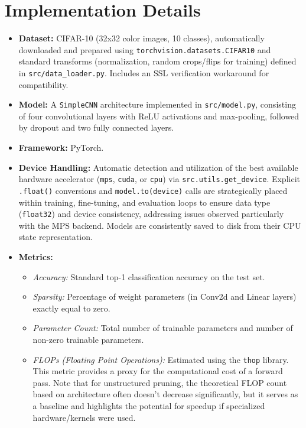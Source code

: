 \documentclass[conference]{IEEEtran} %
\begin{document}
\section{Implementation Details}
\begin{itemize}
    \item \textbf{Dataset:} CIFAR-10 (32x32 color images, 10 classes), automatically downloaded and prepared using \texttt{torchvision.datasets.CIFAR10} and standard transforms (normalization, random crops/flips for training) defined in \texttt{src/data\_loader.py}. Includes an SSL verification workaround for compatibility.
    \item \textbf{Model:} A \texttt{SimpleCNN} architecture implemented in \texttt{src/model.py}, consisting of four convolutional layers with ReLU activations and max-pooling, followed by dropout and two fully connected layers.
    \item \textbf{Framework:} PyTorch.
    \item \textbf{Device Handling:} Automatic detection and utilization of the best available hardware accelerator (\texttt{mps}, \texttt{cuda}, or \texttt{cpu}) via \texttt{src.utils.get\_device}. Explicit \texttt{.float()} conversions and \texttt{model.to(device)} calls are strategically placed within training, fine-tuning, and evaluation loops to ensure data type (\texttt{float32}) and device consistency, addressing issues observed particularly with the MPS backend. Models are consistently saved to disk from their CPU state representation.
    \item \textbf{Metrics:}
        \begin{itemize}
            \item \textit{Accuracy:} Standard top-1 classification accuracy on the test set.
            \item \textit{Sparsity:} Percentage of weight parameters (in Conv2d and Linear layers) exactly equal to zero.
            \item \textit{Parameter Count:} Total number of trainable parameters and number of non-zero trainable parameters.
            \item \textit{FLOPs (Floating Point Operations):} Estimated using the \texttt{thop} library. This metric provides a proxy for the computational cost of a forward pass. Note that for unstructured pruning, the theoretical FLOP count based on architecture often doesn't decrease significantly, but it serves as a baseline and highlights the potential for speedup if specialized hardware/kernels were used.

\end{itemize}
\end{itemize}
\end{document}
